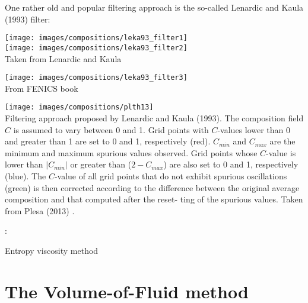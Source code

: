 One rather old and popular filtering approach is the so-called Lenardic and Kaula (1993) \cite{leka93}
filter:

\begin{center}
\texttt{[image: images/compositions/leka93\_filter1]}\\
\texttt{[image: images/compositions/leka93\_filter2]}\\
{\captionfont Taken from Lenardic and Kaula \cite{leka93}}
\end{center}

\begin{center}
\texttt{[image: images/compositions/leka93\_filter3]}\\
{\captionfont From FENICS book}
\end{center}


\begin{center}
\texttt{[image: images/compositions/plth13]}\\
{\captionfont 
Filtering approach proposed by Lenardic and Kaula (1993). 
The composition field $C$ is assumed to vary between 0 and 1. Grid points with $C$-values 
lower than 0 and greater than 1 are set to 0 and 1, respectively (red). 
$C_{min}$ and $C_{max}$ are the minimum and maximum spurious values observed. 
Grid points whose $C$-value is lower than $|C_{min}|$ or greater than ($2-C_{max}$) 
are also set to 0 and 1, respectively (blue). 
The $C$-value of all grid points that do not exhibit spurious oscillations (green) is then corrected
according to the difference between the original average composition and that computed after the reset-
ting of the spurious values.
Taken from Plesa \etal (2013) \cite{plth13}.}
\end{center}











\Literature: \cite{vyrc13}

Entropy viscosity method \cite{gupa11}







\section{The Volume-of-Fluid method} 


